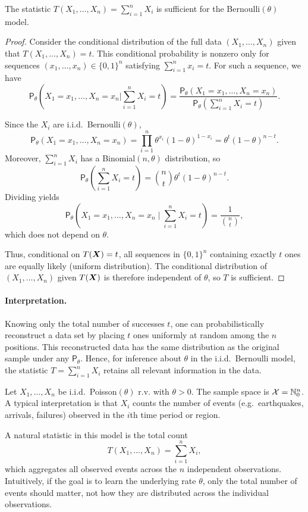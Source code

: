 \begin{claim}
The statistic $T(X_1,\dots,X_n)=\sum\limits_{i=1}^n X_i$ is sufficient for the Bernoulli$(\theta)$ model.
\end{claim}

\begin{proof}
Consider the conditional distribution of the full data $(X_1,\dots,X_n)$ given that
$T(X_1,\dots,X_n)=t$.
This conditional probability is nonzero only for sequences $(x_1,\dots,x_n)\in\{0,1\}^n$
satisfying $\sum\limits_{i=1}^n x_i = t$.
For such a sequence, we have
\[
\mathsf{P}_{\theta}\!\left(
X_1=x_1,\dots,X_n=x_n \Big| \sum_{i=1}^n X_i = t
\right)
=
\frac{\mathsf{P}_{\theta}(X_1=x_1,\dots,X_n=x_n)}
     {\mathsf{P}_{\theta}\!\left(\sum_{i=1}^n X_i = t\right)}.
\]

Since the $X_i$ are i.i.d.\ Bernoulli$(\theta)$,
\[
\mathsf{P}_{\theta}(X_1=x_1,\dots,X_n=x_n)
= \prod_{i=1}^n \theta^{x_i}(1-\theta)^{1-x_i}
= \theta^{t}(1-\theta)^{n-t}.
\]
Moreover, $\sum\limits_{i=1}^n X_i$ has a Binomial$(n,\theta)$ distribution, so
\[
\mathsf{P}_{\theta}\!\left(\sum_{i=1}^n X_i = t\right)
= \binom{n}{t}\theta^{t}(1-\theta)^{n-t}.
\]
Dividing yields
\[
\mathsf{P}_{\theta}\!\left(
X_1=x_1,\dots,X_n=x_n \mid \sum_{i=1}^n X_i = t
\right)
= \frac{1}{\binom{n}{t}},
\]
which does not depend on $\theta$.

Thus, conditional on $T(\boldsymbol{X})=t$, all sequences in $\{0,1\}^n$ containing exactly $t$
ones are equally likely (uniform distribution).
The conditional distribution of $(X_1,\dots,X_n)$ given $T(\boldsymbol{X})$ is therefore independent
of $\theta$, so $T$ is sufficient.
\end{proof}

\paragraph{Interpretation.}
Knowing only the total number of successes $t$, one can probabilistically reconstruct
a data set by placing $t$ ones uniformly at random among the $n$ positions.
This reconstructed data has the same distribution as the original sample under any
$\mathsf{P}_{\theta}$.
Hence, for inference about $\theta$ in the i.i.d.\ Bernoulli model,
the statistic $T=\sum\limits_{i=1}^n X_i$ retains all relevant information in the data.


\begin{ex}
    \label{ex:ch3_pms}
Let $X_1,\dots,X_n$ be i.i.d.\ Poisson$(\theta)$ r.v. with $\theta>0$.
The sample space is $\mathcal{X}=\mathbb{N}_0^n$.
A typical interpretation is that $X_i$ counts the number of events
(e.g.\ earthquakes, arrivals, failures) observed in the $i$th time period or region.

A natural statistic in this model is the total count
\[
T(X_1,\dots,X_n) = \sum\limits_{i=1}^n X_i,
\]
which aggregates all observed events across the $n$ independent observations.
Intuitively, if the goal is to learn the underlying rate $\theta$,
only the total number of events should matter, not how they are distributed
across the individual observations.
\end{ex}


